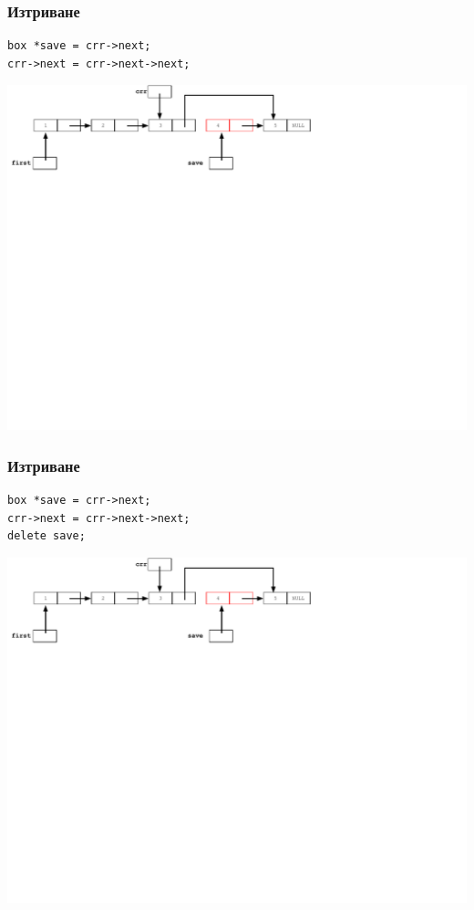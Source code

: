 \documentclass{beamer}
\begin{document}
\begin{frame}[fragile]
\frametitle{Изтриване}

\begin{flushleft}
\begin{lstlisting}
box *save = crr->next;
crr->next = crr->next->next;
\end{lstlisting}  
\end{flushleft}


\includegraphics[width=14.0cm]{images/07_ll_remove_skip}

\end{frame}


\begin{frame}[fragile]
\frametitle{Изтриване}

\begin{flushleft}
\begin{lstlisting}
box *save = crr->next;
crr->next = crr->next->next;
delete save;
\end{lstlisting}  
\end{flushleft}


\includegraphics[width=14.0cm]{images/07_ll_remove_skip}

\end{frame}
\end{document}
